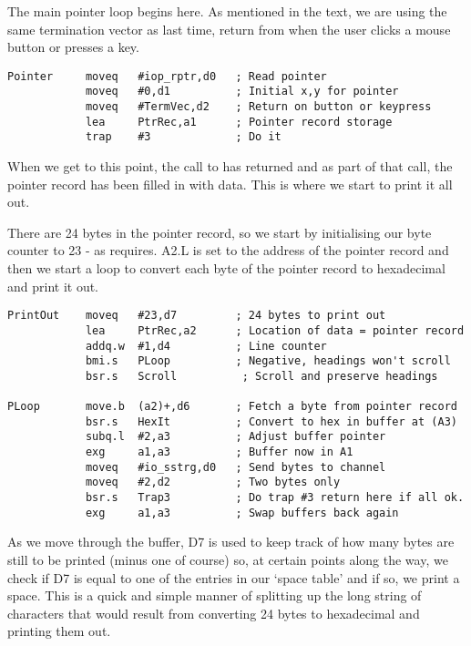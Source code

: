 The main pointer loop begins here. As mentioned in the text, we are using the same
termination vector as last time, return from  when the user clicks a mouse button
or presses a key.

\begin{lstlisting}[firstnumber=last,caption={Pointer Record Examiner - Read Pointer}]
Pointer     moveq   #iop_rptr,d0   ; Read pointer
            moveq   #0,d1          ; Initial x,y for pointer
            moveq   #TermVec,d2    ; Return on button or keypress
            lea     PtrRec,a1      ; Pointer record storage
            trap    #3             ; Do it
\end{lstlisting}

When we get to this point, the call to  has returned and as part of that call, the
pointer record has been filled in with data. This is where we start to print it all
out.

There are 24 bytes in the pointer record, so we start by initialising our byte counter to
23 -{} as  requires. A2.L is set to the address of the pointer record and then we start
a loop to convert each byte of the pointer record to hexadecimal and print it out.

\begin{lstlisting}[firstnumber=last,caption={Pointer Record Examiner - Print Details}]
PrintOut    moveq   #23,d7         ; 24 bytes to print out
            lea     PtrRec,a2      ; Location of data = pointer record
            addq.w  #1,d4          ; Line counter
            bmi.s   PLoop          ; Negative, headings won't scroll 
            bsr.s   Scroll	        ; Scroll and preserve headings

PLoop       move.b  (a2)+,d6       ; Fetch a byte from pointer record
            bsr.s   HexIt          ; Convert to hex in buffer at (A3)
            subq.l  #2,a3          ; Adjust buffer pointer
            exg     a1,a3          ; Buffer now in A1
            moveq   #io_sstrg,d0   ; Send bytes to channel
            moveq   #2,d2          ; Two bytes only
            bsr.s   Trap3          ; Do trap #3 return here if all ok.
            exg     a1,a3          ; Swap buffers back again
\end{lstlisting}

As we move through the buffer, D7 is used to keep track of how many bytes are still to be
printed (minus one of course) so, at certain points along the way, we check if D7 is equal
to one of the entries in our `space table' and if so, we print a space. This is a quick
and simple manner of splitting up the long string of characters that would result from
converting 24 bytes to hexadecimal and printing them out. 

